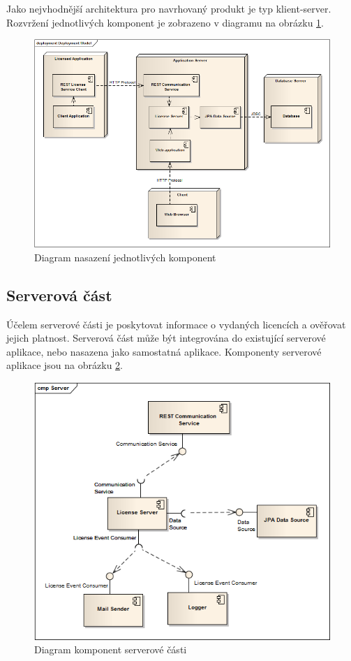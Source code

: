 Jako nejvhodnější architektura pro navrhovaný produkt je typ klient-server.
Rozvržení jednotlivých komponent je zobrazeno v diagramu na obrázku
\ref{fig:deployment}.

\begin{figure}[H]
\begin{center}
\includegraphics[width=12cm]{figures/deployment.png}
\caption{Diagram nasazení jednotlivých komponent}
\label{fig:deployment} 
\end{center}
\end{figure}

\subsection{Serverová část}

Účelem serverové části je poskytovat informace o vydaných licencích a ověřovat
jejich platnost. Serverová část může být integrována do existující serverové
aplikace, nebo nasazena jako samostatná aplikace. Komponenty serverové aplikace
jsou na obrázku \ref{fig:components-server}.


\begin{figure}[H]
\begin{center}
\includegraphics[width=12cm]{figures/components-server.png}
\caption{Diagram komponent serverové části}
\label{fig:components-server} 
\end{center}
\end{figure}

